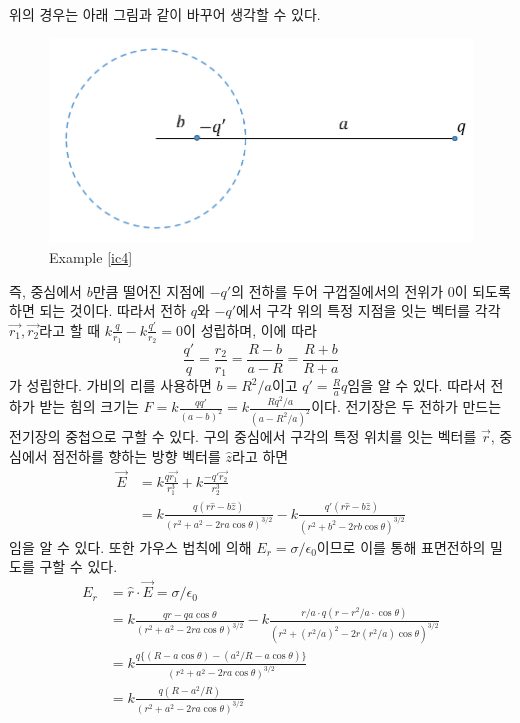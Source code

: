 위의 경우는 아래 그림과 같이 바꾸어 생각할 수 있다.
\begin{figure}[h]
\centering\includegraphics[scale=0.4]{Pictures/image_charge-5.PNG}
\caption{Example \ref{ic4}}
\end{figure}
즉, 중심에서 $b$만큼 떨어진 지점에 $-q'$의 전하를 두어 구껍질에서의 전위가 0이 되도록 하면 되는 것이다. 따라서 전하 $q$와 $-q'$에서 구각 위의 특정 지점을 잇는 벡터를 각각 $\vec{r_1}, \vec{r_2}$라고 할 때 $k\frac{q}{r_1}-k\frac{q'}{r_2}=0$이 성립하며, 이에 따라 
\begin{equation}
\frac{q'}{q}=\frac{r_2}{r_1}=\frac{R-b}{a-R}=\frac{R+b}{R+a}
\end{equation}
가 성립한다. 가비의 리를 사용하면 $b=R^2/a$이고 $q'=\frac{R}{a}q$임을 알 수 있다. 따라서 전하가 받는 힘의 크기는 $F=k\frac{qq'}{(a-b)^2}=k\frac{Rq^2/a}{(a-R^2/a)^2}$이다.
전기장은 두 전하가 만드는 전기장의 중첩으로 구할 수 있다. 구의 중심에서 구각의 특정 위치를 잇는 벡터를 $\vec{r}$, 중심에서 점전하를 향하는 방향 벡터를 $\hat{z}$라고 하면
\begin{align}
\vec{E}&=k\frac{q\vec{r_1}}{r_1^3}+k\frac{-q'\vec{r_2}}{r_2^3}\\
&=k\frac{q(r\hat{r}-b\hat{z})}{(r^2+a^2-2ra\cos\theta)^{3/2}}-k\frac{q'(r\hat{r}-b\hat{z})}{(r^2+b^2-2rb\cos\theta)^{3/2}}
\end{align}
임을 알 수 있다. 또한 가우스 법칙에 의해 $E_r = \sigma/\epsilon_0$이므로 이를 통해 표면전하의 밀도를 구할 수 있다.
\begin{align}
E_r &= \hat{r} \cdot \vec{E} = \sigma /\epsilon_0\\
&= k\frac{qr-qa\cos\theta}{(r^2+a^2-2ra\cos\theta)^{3/2}}-k\frac{r/a\cdot q(r-r^2/a\cdot \cos\theta)}{(r^2+(r^2/a)^2-2r(r^2/a)\cos\theta)^{3/2}}\\
&= k\frac{q\{(R-a\cos\theta)-(a^2/R-a\cos\theta)\}}{(r^2+a^2-2ra\cos\theta)^{3/2}}\\
&= k\frac{q(R-a^2/R)}{(r^2+a^2-2ra\cos\theta)^{3/2}}
\end{align}
